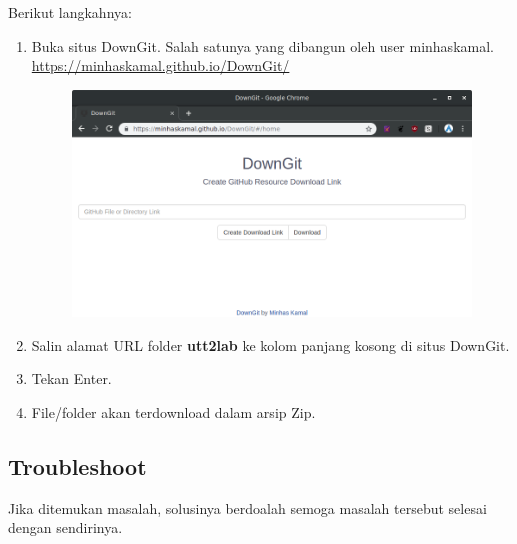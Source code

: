 \documentclass[12pt,]{article}
\begin{document}
	Berikut langkahnya:
	\begin{enumerate}
		\item Buka situs DownGit.
		Salah satunya yang dibangun oleh user minhaskamal.\\
		\url{https://minhaskamal.github.io/DownGit/}
		
		\begin{figure}[!ht]
			\centering
			\includegraphics[width=450pt]{downgit.png}
		\end{figure}
		
		\item Salin alamat URL folder \textbf{utt2lab} ke kolom panjang kosong di situs DownGit.
		
		\item Tekan Enter.
		
		\item File/folder akan terdownload dalam arsip Zip.
	\end{enumerate}

	\subsection{Troubleshoot}
	
	Jika ditemukan masalah, solusinya berdoalah semoga masalah tersebut selesai dengan sendirinya.
	
\end{document}
